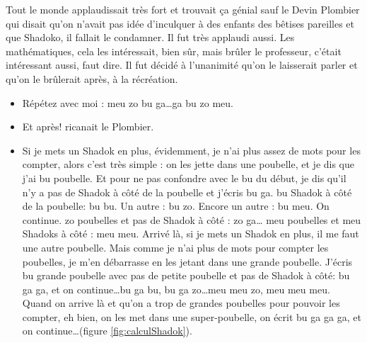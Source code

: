 \begin{td}
Tout le monde applaudissait très fort et trouvait ça génial sauf le Devin Plombier 
qui disait qu'on n'avait pas idée d'inculquer à des enfants des bêtises pareilles 
et que Shadoko, il fallait le condamner. 
Il fut très applaudi aussi. Les mathématiques, 
cela les intéressait, bien sûr, mais brûler le professeur, c'était intéressant aussi, faut dire. 
Il fut décidé à l'unanimité qu'on le laisserait parler et qu'on le brûlerait après, à la récréation.
\begin{itemize}
\item Répétez avec moi : {\sc meu} {\sc zo} {\sc bu} {\sc ga}\ldots {\sc ga} {\sc bu} {\sc zo} {\sc meu}.
\item Et après! ricanait le Plombier.
\item Si je mets un Shadok en plus, évidemment, je n'ai plus assez 
de mots pour les compter, alors c'est très simple : on les jette dans une poubelle, 
et je dis que j'ai {\sc bu} poubelle. Et pour ne pas confondre avec le {\sc bu} du début, 
je dis qu'il n'y a pas de Shadok à côté de la poubelle et j'écris {\sc bu} {\sc ga}. 
{\sc bu} Shadok à côté de la poubelle: {\sc bu} {\sc bu}. Un autre : {\sc bu} {\sc zo}. Encore un autre : {\sc bu} {\sc meu}. 
On continue. {\sc zo} poubelles et pas de Shadok à côté : {\sc zo} {\sc ga}\ldots 
{\sc meu} poubelles et {\sc meu} Shadoks à côté : {\sc meu} {\sc meu}. 
Arrivé là, si je mets un Shadok en plus, il me faut une autre poubelle. 
Mais comme je n'ai plus de mots pour compter les poubelles, je m'en débarrasse 
en les jetant dans une grande poubelle. 
J'écris {\sc bu} grande poubelle avec pas de petite poubelle 
et pas de Shadok à côté: {\sc bu} {\sc ga} {\sc ga}, et on continue\ldots {\sc bu} {\sc ga} {\sc bu}, 
{\sc bu} {\sc ga} {\sc zo}\ldots {\sc meu} {\sc meu} {\sc zo}, {\sc meu} {\sc meu} {\sc meu}.
Quand on arrive là et qu'on a trop de grandes poubelles pour pouvoir les compter, 
eh bien, on les met dans une super-poubelle, on écrit {\sc bu} {\sc ga} {\sc ga} {\sc ga}, 
et on continue\ldots (figure \ref{fig:calculShadok}).
\end{itemize}


\end{td}

